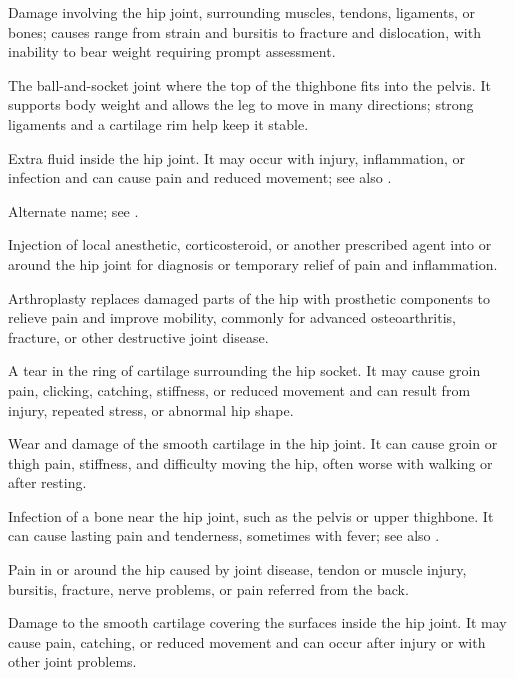  Damage involving the hip joint, surrounding muscles, tendons, ligaments, or bones; causes range from strain and bursitis to fracture and dislocation, with inability to bear weight requiring prompt assessment.

 The ball-and-socket joint where the top of the thighbone fits into the pelvis. It supports body weight and allows the leg to move in many directions; strong ligaments and a cartilage rim help keep it stable.

 Extra fluid inside the hip joint. It may occur with injury, inflammation, or infection and can cause pain and reduced movement; see also .

 Alternate name; see .

 Injection of local anesthetic, corticosteroid, or another prescribed agent into or around the hip joint for diagnosis or temporary relief of pain and inflammation.

 Arthroplasty replaces damaged parts of the hip with prosthetic components to relieve pain and improve mobility, commonly for advanced osteoarthritis, fracture, or other destructive joint disease.

 A tear in the ring of cartilage surrounding the hip socket. It may cause groin pain, clicking, catching, stiffness, or reduced movement and can result from injury, repeated stress, or abnormal hip shape.

 Wear and damage of the smooth cartilage in the hip joint. It can cause groin or thigh pain, stiffness, and difficulty moving the hip, often worse with walking or after resting.

 Infection of a bone near the hip joint, such as the pelvis or upper thighbone. It can cause lasting pain and tenderness, sometimes with fever; see also .

 Pain in or around the hip caused by joint disease, tendon or muscle injury, bursitis, fracture, nerve problems, or pain referred from the back.

 Damage to the smooth cartilage covering the surfaces inside the hip joint. It may cause pain, catching, or reduced movement and can occur after injury or with other joint problems.

